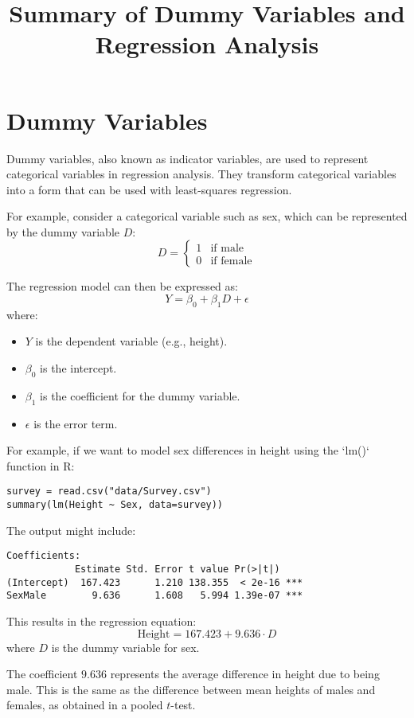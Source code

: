 \documentclass{article}
\begin{document}
\title{Summary of Dummy Variables and Regression Analysis}
\author{}
\date{}
\maketitle

\section{Dummy Variables}

Dummy variables, also known as indicator variables, are used to represent categorical variables in regression analysis. They transform categorical variables into a form that can be used with least-squares regression. 

For example, consider a categorical variable such as sex, which can be represented by the dummy variable \( D \):
\[
D = 
\begin{cases} 
1 & \text{if male} \\
0 & \text{if female}
\end{cases}
\]

The regression model can then be expressed as:
\[
Y = \beta_0 + \beta_1 D + \epsilon
\]
where:
\begin{itemize}
    \item \( Y \) is the dependent variable (e.g., height).
    \item \( \beta_0 \) is the intercept.
    \item \( \beta_1 \) is the coefficient for the dummy variable.
    \item \( \epsilon \) is the error term.
\end{itemize}

For example, if we want to model sex differences in height using the `lm()` function in R:
\begin{verbatim}
survey = read.csv("data/Survey.csv")
summary(lm(Height ~ Sex, data=survey))
\end{verbatim}
The output might include:
\begin{verbatim}
Coefficients:
            Estimate Std. Error t value Pr(>|t|)    
(Intercept)  167.423      1.210 138.355  < 2e-16 ***
SexMale        9.636      1.608   5.994 1.39e-07 ***
\end{verbatim}

This results in the regression equation:
\[
\text{Height} = 167.423 + 9.636 \cdot D
\]
where \( D \) is the dummy variable for sex.

The coefficient \( 9.636 \) represents the average difference in height due to being male. This is the same as the difference between mean heights of males and females, as obtained in a pooled \( t \)-test.
\end{document}
